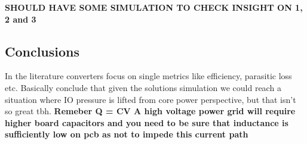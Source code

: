 \documentclass[letterpaper,twocolumn,10pt]{article}
\begin{document}
\textbf{SHOULD HAVE SOME SIMULATION TO CHECK INSIGHT ON 1, 2 and 3}\\

\subsection{Conclusions}

In the literature converters focus on single metrics like efficiency, parasitic loss etc.
Basically conclude that given the solutions simulation we could reach a situation where IO pressure is lifted from core power perspective, but that isn't so great tbh. 
\textbf{Remeber Q = CV A high voltage power grid will require higher board capacitors and you need to be sure that inductance is sufficiently low on pcb as not to impede this current path}  


{\footnotesize 
}


\theendnotes
\end{document}
